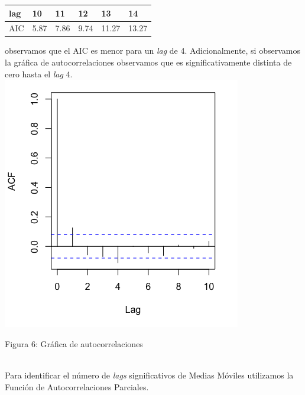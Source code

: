 \documentclass[12pt,reqno,letter]{article}
\newenvironment{fig2}[1][\unskip]{}{} %
\begin{document}
\begin{multicols}{2}
\begin{center}
\begin{tabular}{llllll}
lag & 10     & 11    & 12    & 13    & 14    \\
\hline
AIC & 5.87 & 7.86 & 9.74 & 11.27 & 13.27 
\end{tabular}
\end{center}

observamos que el AIC es menor para un \textit{lag} de 4. Adicionalmente, si observamos la gráfica de autocorrelaciones observamos que es significativamente distinta de cero hasta el \textit{lag} 4.
\\

\begin{fig2}\includegraphics[scale=0.5]{img/ACF.png}
\caption{Figura 6: Gráfica de autocorrelaciones}\end{fig2}
\\
Para identificar el número de \textit{lags} significativos de Medias Móviles utilizamos la Función de Autocorrelaciones Parciales. 


\end{multicols}
\end{document}
